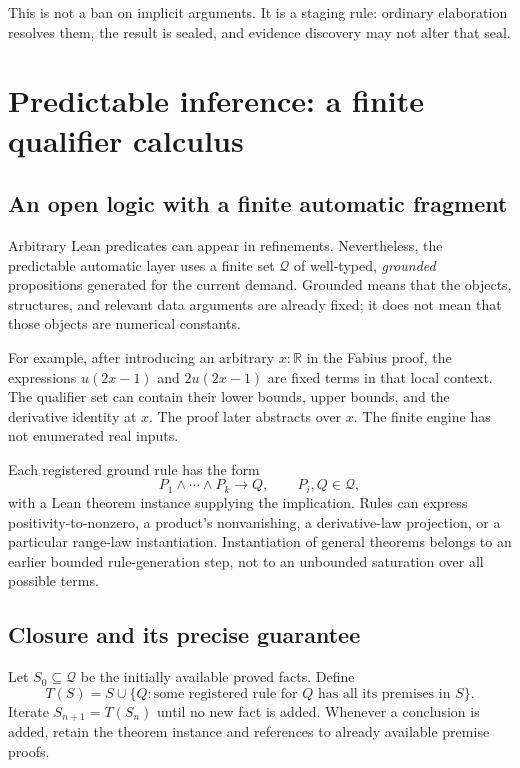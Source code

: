 \documentclass[11pt,a4paper]{article}
\theoremstyle{definition}
\theoremstyle{remark}
\newcommand{\R}{\mathbb R}
\begin{document}
This is not a ban on implicit arguments. It is a staging rule: ordinary elaboration resolves them, the result is sealed, and evidence discovery may not alter that seal.

\section{Predictable inference: a finite qualifier calculus}
\label{sec:qualifiers}

\subsection{An open logic with a finite automatic fragment}
Arbitrary Lean predicates can appear in refinements. Nevertheless, the predictable automatic layer uses a finite set $\mathcal Q$ of well-typed, \emph{grounded} propositions generated for the current demand. Grounded means that the objects, structures, and relevant data arguments are already fixed; it does not mean that those objects are numerical constants.

For example, after introducing an arbitrary $x:\R$ in the Fabius proof, the expressions $u(2x-1)$ and $2u(2x-1)$ are fixed terms in that local context. The qualifier set can contain their lower bounds, upper bounds, and the derivative identity at $x$. The proof later abstracts over $x$. The finite engine has not enumerated real inputs.

Each registered ground rule has the form
\[
 P_1\wedge\cdots\wedge P_k\longrightarrow Q,
 \qquad P_i,Q\in\mathcal Q,
\]
with a Lean theorem instance supplying the implication. Rules can express positivity-to-nonzero, a product's nonvanishing, a derivative-law projection, or a particular range-law instantiation. Instantiation of general theorems belongs to an earlier bounded rule-generation step, not to an unbounded saturation over all possible terms.

\subsection{Closure and its precise guarantee}
Let $S_0\subseteq\mathcal Q$ be the initially available proved facts. Define
\[
 T(S)=S\cup\{Q:\text{some registered rule for }Q
                       \text{ has all its premises in }S\}.
\]
Iterate $S_{n+1}=T(S_n)$ until no new fact is added. Whenever a conclusion is added, retain the theorem instance and references to already available premise proofs.
\end{document}
